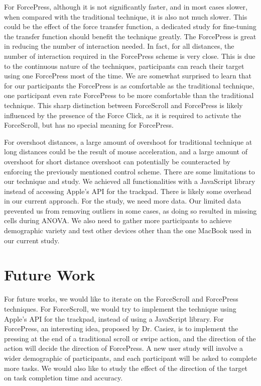 \documentclass{sigchi}
\begin{document}
For ForcePress, although it is not significantly faster, and in most cases slower, when compared with the traditional technique, it is also not much slower. This could be the effect of the force transfer function, a dedicated study for fine-tuning the transfer function should benefit the technique greatly. The ForcePress is great in reducing the number of interaction needed. In fact, for all distances, the number of interaction required in the ForcePress scheme is very close. This is due to the continuous nature of the techniques, participants can reach their target using one ForcePress most of the time. We are somewhat surprised to learn that for our participants the ForcePress is as comfortable as the traditional technique, one participant even rate ForcePress to be more comfortable than the traditional technique. This sharp distinction between ForceScroll and ForcePress is likely influenced by the presence of the Force Click, as it is required to activate the ForceScroll, but has no special meaning for ForcePress.  

For overshoot distances, a large amount of overshoot for traditional technique at long distances could be the result of mouse acceleration, and a large amount of overshoot for short distance overshoot can potentially be counteracted by enforcing the previously mentioned control scheme. There are some limitations to our technique and study. We achieved all functionalities with a JavaScript library instead of accessing Apple's API for the trackpad. There is likely some overhead in our current approach.  For the study, we need more data. Our limited data prevented us from removing outliers in some cases, as doing so resulted in missing cells during ANOVA. We also need to gather more participants to achieve demographic variety and test other devices other than the one MacBook used in our current study.  
\section{Future Work}
For future works, we would like to iterate on the ForceScroll and ForcePress techniques. For ForceScroll, we would try to implement the technique using Apple's API for the trackpad, instead of using a JavaScript library. For ForcePress, an interesting idea, proposed by Dr. Casiez, is to implement the pressing at the end of a traditional scroll or swipe action, and the direction of the action will decide the direction of ForcePress. A new user study will involve a wider demographic of participants, and each participant will be asked to complete more tasks. We would also like to study the effect of the direction of the target on task completion time and accuracy.  
\end{document}
